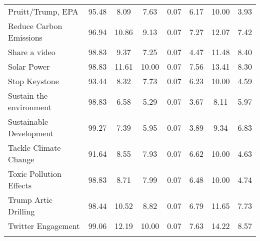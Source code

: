 \begin{longtable}{L|ccccccc}
  Pruitt/Trump, EPA & 95.48 & 8.09 & 7.63 & 0.07 & 6.17 & 10.00 & 3.93 \\ 
  Reduce Carbon Emissions & 96.94 & 10.86 & 9.13 & 0.07 & 7.27 & 12.07 & 7.42 \\ 
  Share a video & 98.83 & 9.37 & 7.25 & 0.07 & 4.47 & 11.48 & 8.40 \\ 
  Solar Power & 98.83 & 11.61 & 10.00 & 0.07 & 7.56 & 13.41 & 8.30 \\ 
  Stop Keystone & 93.44 & 8.32 & 7.73 & 0.07 & 6.23 & 10.00 & 4.59 \\ 
  Sustain the environment & 98.83 & 6.58 & 5.29 & 0.07 & 3.67 & 8.11 & 5.97 \\ 
  Sustainable Development & 99.27 & 7.39 & 5.95 & 0.07 & 3.89 & 9.34 & 6.83 \\ 
  Tackle Climate Change & 91.64 & 8.55 & 7.93 & 0.07 & 6.62 & 10.00 & 4.63 \\ 
  Toxic Pollution Effects & 98.83 & 8.71 & 7.99 & 0.07 & 6.48 & 10.00 & 4.74 \\ 
  Trump Artic Drilling & 98.44 & 10.52 & 8.82 & 0.07 & 6.79 & 11.65 & 7.73 \\ 
  Twitter Engagement & 99.06 & 12.19 & 10.00 & 0.07 & 7.63 & 14.22 & 8.57 \\ 
  \hline
\label{tab:DailyAttIND}
\end{longtable}
